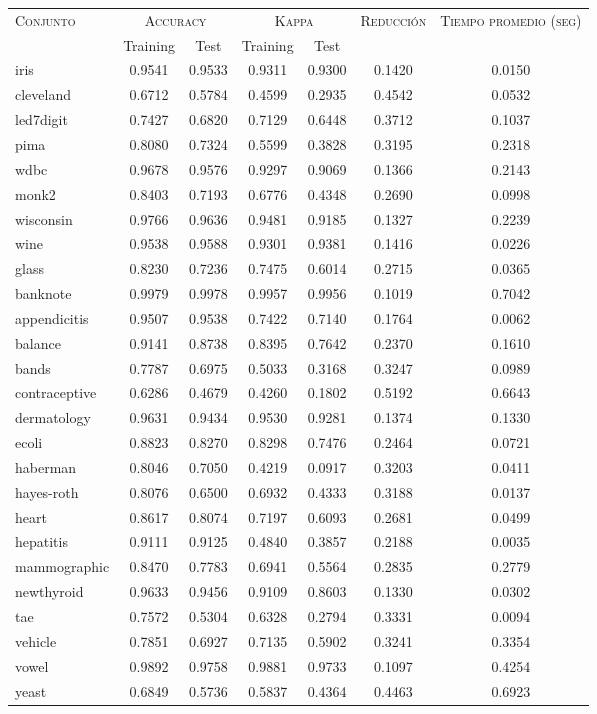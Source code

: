 \begin{table}[]
\centering
\begin{tabular}{l c c c c c c}
\hline
\multirow{2}{*}{\textsc{Conjunto}}
	& \multicolumn{2}{c}{\textsc{Accuracy}}
	& \multicolumn{2}{c}{\textsc{Kappa}}
	& \textsc{Reducción}
	& \textsc{Tiempo promedio (seg)} \\
	& Training & Test
	& Training & Test \\ 
\hline
\hline

iris & 0.9541 & 0.9533 & 0.9311 & 0.9300 & 0.1420 & 0.0150 \\
cleveland & 0.6712 & 0.5784 & 0.4599 & 0.2935 & 0.4542 & 0.0532 \\
led7digit & 0.7427 & 0.6820 & 0.7129 & 0.6448 & 0.3712 & 0.1037 \\
pima & 0.8080 & 0.7324 & 0.5599 & 0.3828 & 0.3195 & 0.2318 \\
wdbc & 0.9678 & 0.9576 & 0.9297 & 0.9069 & 0.1366 & 0.2143 \\
monk2 & 0.8403 & 0.7193 & 0.6776 & 0.4348 & 0.2690 & 0.0998 \\
wisconsin & 0.9766 & 0.9636 & 0.9481 & 0.9185 & 0.1327 & 0.2239 \\
wine & 0.9538 & 0.9588 & 0.9301 & 0.9381 & 0.1416 & 0.0226 \\
glass & 0.8230 & 0.7236 & 0.7475 & 0.6014 & 0.2715 & 0.0365 \\
banknote & 0.9979 & 0.9978 & 0.9957 & 0.9956 & 0.1019 & 0.7042 \\
appendicitis & 0.9507 & 0.9538 & 0.7422 & 0.7140 & 0.1764 & 0.0062 \\
balance & 0.9141 & 0.8738 & 0.8395 & 0.7642 & 0.2370 & 0.1610 \\
bands & 0.7787 & 0.6975 & 0.5033 & 0.3168 & 0.3247 & 0.0989 \\
contraceptive & 0.6286 & 0.4679 & 0.4260 & 0.1802 & 0.5192 & 0.6643 \\
dermatology & 0.9631 & 0.9434 & 0.9530 & 0.9281 & 0.1374 & 0.1330 \\
ecoli & 0.8823 & 0.8270 & 0.8298 & 0.7476 & 0.2464 & 0.0721 \\
haberman & 0.8046 & 0.7050 & 0.4219 & 0.0917 & 0.3203 & 0.0411 \\
hayes-roth & 0.8076 & 0.6500 & 0.6932 & 0.4333 & 0.3188 & 0.0137 \\
heart & 0.8617 & 0.8074 & 0.7197 & 0.6093 & 0.2681 & 0.0499 \\
hepatitis & 0.9111 & 0.9125 & 0.4840 & 0.3857 & 0.2188 & 0.0035 \\
mammographic & 0.8470 & 0.7783 & 0.6941 & 0.5564 & 0.2835 & 0.2779 \\
newthyroid & 0.9633 & 0.9456 & 0.9109 & 0.8603 & 0.1330 & 0.0302 \\
tae & 0.7572 & 0.5304 & 0.6328 & 0.2794 & 0.3331 & 0.0094 \\
vehicle & 0.7851 & 0.6927 & 0.7135 & 0.5902 & 0.3241 & 0.3354 \\
vowel & 0.9892 & 0.9758 & 0.9881 & 0.9733 & 0.1097 & 0.4254 \\
yeast & 0.6849 & 0.5736 & 0.5837 & 0.4364 & 0.4463 & 0.6923 \\


\end{tabular}
\end{table}
